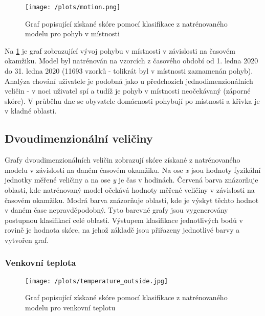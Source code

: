 \begin{figure}[H]
  \centering
  \texttt{[image: /plots/motion.png]}
  \caption{Graf popisující získané skóre pomocí klasifikace z natrénovaného modelu pro pohyb v místnosti}
  \label{fig:app_motion}
\end{figure}

Na \cref{fig:app_motion} je graf zobrazující vývoj pohybu v místnosti v závislosti na časovém okamžiku. Model byl natrénován na vzorcích z časového období od 1. ledna 2020 do 31. ledna 2020 (11693 vzorků - tolikrát byl v místnosti zaznamenán pohyb). Analýza chování uživatele je podobná jako u předchozích jednodimenzionálních veličin - v noci uživatel spí a tudíž je pohyb v místnosti neočekávaný (záporné skóre). V průběhu dne se obyvatele domácnosti pohybují po místnosti a křivka je v kladné oblasti. 

\subsection*{Dvoudimenzionální veličiny}

Grafy dvoudimenzionálních veličin zobrazují skóre získané z natrénovaného modelu v závislosti na daném časovém okamžiku. Na ose \textit{x} jsou hodnoty fyzikální jednotky měřené veličiny a na ose \textit{y} je čas v hodinách. Červená barva znázorňuje oblasti, kde natrénovaný model očekává hodnoty měřené veličiny v závislosti na časovém okamžiku. Modrá barva znázorňuje oblasti, kde je výskyt těchto hodnot v daném čase nepravděpodobný. Tyto barevné grafy jsou vygenerovány postupnou klasifikací celé oblasti. Výstupem klasifikace jednotlivých bodů v rovině je hodnota skóre, na jehož základě jsou přiřazeny jednotlivé barvy a vytvořen graf. 

\subsubsection*{Venkovní teplota}

\begin{figure}[H]
  \centering
  \texttt{[image: /plots/temperature\_outside.jpg]}
  \caption{Graf popisující získané skóre pomocí klasifikace z natrénovaného modelu pro venkovní teplotu}
  \label{fig:app_temperature_outside}
\end{figure}

